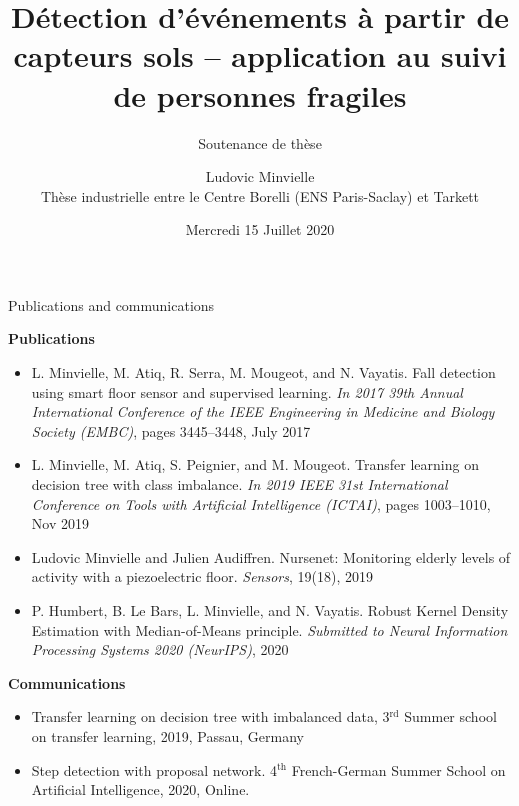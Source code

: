 \documentclass[8pt,t,aspectratio=1610]{beamer}
\title{Détection d'événements à partir de capteurs sols -- application au suivi de personnes fragiles}
\subtitle{Soutenance de thèse}
\author{Ludovic Minvielle\\[0.4cm]
        Thèse industrielle entre le Centre Borelli (ENS Paris-Saclay) et Tarkett
    }
\date{Mercredi 15 Juillet 2020}
\begin{document}
\graphicspath{{./images/}}

\begingroup
\makeatletter
\makeatother
{}  %
\endgroup
% 







\section{}
\subsection{}

\begin{frame}[noframenumbering]{Publications and communications}

\small
\centering
\textbf{Publications}
\begin{itemize}
    \item L. Minvielle, M. Atiq, R. Serra, M. Mougeot, and N. Vayatis. \textcolor{myblue}{Fall detection using smart floor sensor and supervised learning.}
\textit{In 2017 39th Annual International Conference of the IEEE Engineering in Medicine and Biology Society (EMBC)}, pages
3445–3448, July 2017
    \item L. Minvielle, M. Atiq, S. Peignier, and M. Mougeot. \textcolor{myblue}{Transfer learning on decision tree with class imbalance.}
\textit{In 2019 IEEE 31st International Conference on Tools with Artificial Intelligence (ICTAI)}, pages 1003–1010, Nov 2019
    \item Ludovic Minvielle and Julien Audiffren. \textcolor{myblue}{Nursenet: Monitoring elderly levels of activity with a piezoelectric floor.}
\textit{Sensors}, 19(18), 2019
    \item P. Humbert, B. Le Bars, L. Minvielle, and N. Vayatis. \textcolor{myblue}{Robust Kernel Density Estimation with Median-of-Means principle}. \textit{Submitted to Neural Information Processing Systems 2020 (NeurIPS)}, 2020
\end{itemize}
\medskip
\centering
\textbf{Communications}
\begin{itemize}
    \item Transfer learning on decision tree with imbalanced data, 3$^{\text{rd}}$ Summer school on transfer learning, 2019, Passau, Germany
    \item Step detection with proposal network. 4$^{\text{th}}$ French-German Summer School on Artificial Intelligence, 2020, Online.
\end{itemize}

\end{frame}
\end{document}
